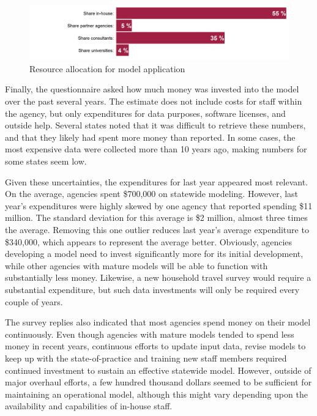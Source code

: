 \begin{figure}   %
\centering
\includegraphics[width=6.4in]{graphics/38-application-resource-allocation}
\caption{Resource allocation for model application}
\label{fig:application-resource-allocation}
\end{figure}

Finally, the questionnaire asked how much money was invested into the model over the past several years. The estimate does not include costs for staff within the agency, but only expenditures for data purposes, software licenses, and outside help. Several states noted that it was difficult to retrieve these numbers, and that they likely had spent more money than reported. In some cases, the most expensive data were collected more than 10 years ago, making numbers for some states seem low.

Given these uncertainties, the expenditures for last year appeared most relevant. On the average, agencies spent \$700,000 on statewide modeling. However, last year's expenditures were highly skewed by one agency that reported spending \$11 million. The standard deviation for this average is \$2 million, almost three times the average. Removing this one outlier reduces last year's average expenditure to \$340,000, which appears to represent the average better. Obviously, agencies developing a model need to invest significantly more for its initial development, while other agencies with mature models will be able to function with substantially less money. Likewise, a new household travel survey would require a substantial expenditure, but such data investments will only be required every couple of years.

The survey replies also indicated that most agencies spend money on their model continuously. Even though agencies with mature models tended to spend less money in recent years, continuous efforts to update input data, revise models to keep up with the state-of-practice and training new staff members required continued investment to sustain an effective statewide model. However, outside of major overhaul efforts, a few hundred thousand dollars seemed to be sufficient for maintaining an operational model, although this might vary depending upon the availability and capabilities of in-house staff.

